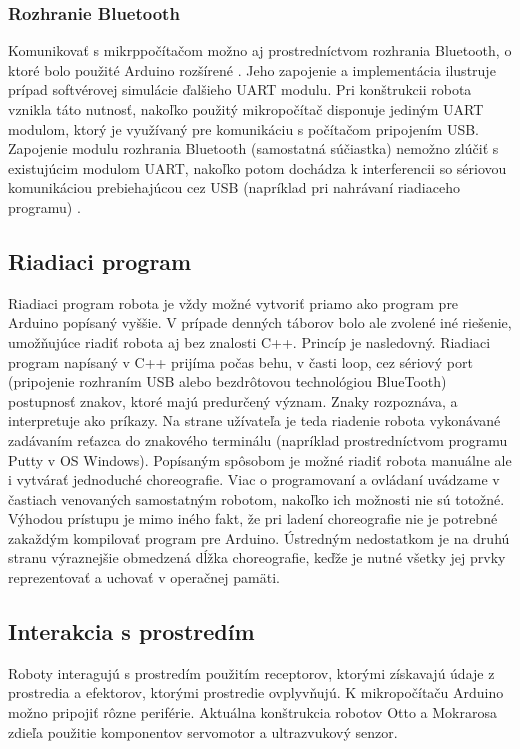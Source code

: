 \subsubsection{Rozhranie Bluetooth}
Komunikovať s mikrppočítačom možno aj prostredníctvom rozhrania Bluetooth, o ktoré bolo použité Arduino rozšírené \cite{PetrovicVaskoOtto}. Jeho zapojenie a implementácia ilustruje prípad softvérovej simulácie ďalšieho UART modulu. Pri konštrukcii robota vznikla táto nutnosť, nakoľko použitý mikropočítač disponuje jediným UART modulom, ktorý je využívaný pre komunikáciu s počítačom pripojením USB. Zapojenie modulu rozhrania Bluetooth (samostatná súčiastka) nemožno zlúčiť s existujúcim modulom UART, nakoľko potom dochádza k interferencii so sériovou komunikáciou prebiehajúcou cez USB (napríklad pri nahrávaní riadiaceho programu) \cite{PetrovicVaskoOtto}.


\subsection{Riadiaci program}
Riadiaci program robota je vždy možné vytvoriť priamo ako program pre Arduino popísaný vyššie. V prípade denných táborov bolo ale zvolené iné riešenie, umožňujúce riadiť robota aj bez znalosti C++. Princíp je nasledovný. Riadiaci program napísaný v C++ prijíma počas behu, v časti loop, cez sériový port (pripojenie rozhraním USB alebo bezdrôtovou technológiou BlueTooth) postupnosť znakov, ktoré majú predurčený význam. Znaky rozpoznáva, a interpretuje ako príkazy. Na strane užívateľa je teda riadenie robota vykonávané zadávaním reťazca do znakového terminálu (napríklad prostredníctvom programu Putty v OS Windows). Popísaným spôsobom je možné riadiť robota manuálne ale i vytvárať jednoduché choreografie. Viac o programovaní a ovládaní uvádzame v častiach venovaných samostatným robotom, nakoľko ich možnosti nie sú totožné. Výhodou prístupu je mimo iného fakt, že pri ladení choreografie nie je potrebné zakaždým kompilovať program pre Arduino. Ústredným nedostatkom je na druhú stranu výraznejšie obmedzená dĺžka choreografie, keďže je nutné všetky jej prvky reprezentovať a uchovať v operačnej pamäti.

\subsection{Interakcia s prostredím}
Roboty interagujú s prostredím použitím receptorov, ktorými získavajú údaje z prostredia a efektorov, ktorými prostredie ovplyvňujú. K mikropočítaču Arduino možno pripojiť rôzne periférie. Aktuálna konštrukcia robotov Otto a Mokrarosa zdieľa použitie komponentov servomotor a ultrazvukový senzor.

